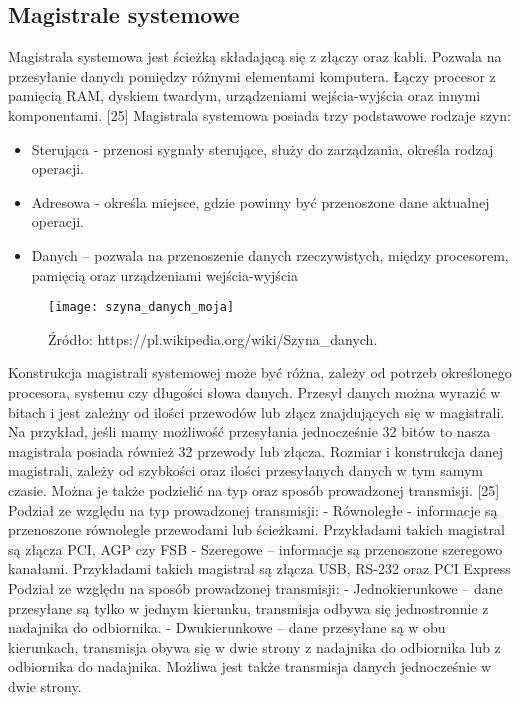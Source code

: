 \documentclass[12pt, a4paper, onside, polish]{article}				%
\begin{document}
\subsection{Magistrale systemowe}
\hspace{\parindent}
Magistrala systemowa jest ścieżką składającą się z złączy oraz kabli. Pozwala na przesyłanie danych pomiędzy różnymi elementami komputera. Łączy procesor z pamięcią RAM, dyskiem twardym, urządzeniami wejścia-wyjścia oraz innymi komponentami. [25]  \newline\newline
Magistrala systemowa posiada trzy podstawowe rodzaje szyn:
\begin{itemize}
\item Sterująca - przenosi sygnały sterujące, służy do zarządzania, określa rodzaj operacji.
\item Adresowa - określa miejsce, gdzie powinny być przenoszone dane aktualnej operacji. 
\item Danych – pozwala na przenoszenie danych rzeczywistych, między procesorem, pamięcią oraz urządzeniami wejścia-wyjścia 
\end{itemize}
 
 
 \begin{figure}[H]
{\centering \texttt{[image: szyna\_danych\_moja]} \caption{Magistrala systemowa} \caption*{Źródło: https://pl.wikipedia.org/wiki/Szyna_danych.}}\vspace{5mm}
\end{figure}


Konstrukcja magistrali systemowej może być różna, zależy od potrzeb określonego procesora, systemu czy długości słowa danych. Przesył danych można wyrazić w bitach i jest zależny od ilości przewodów lub złącz znajdujących się w magistrali. Na przykład, jeśli mamy możliwość przesyłania jednocześnie 32 bitów to nasza magistrala posiada również 32 przewody lub złącza. Rozmiar i konstrukcja danej magistrali, zależy od szybkości oraz ilości przesyłanych danych w tym samym czasie. Można je także podzielić na typ oraz sposób prowadzonej transmisji. [25] \newline \newline
Podział ze względu na typ prowadzonej transmisji: \newline
- Równoległe - informacje są przenoszone równolegle przewodami lub ścieżkami. Przykładami takich magistral są złącza PCI, AGP czy FSB \newline
- Szeregowe – informacje są przenoszone szeregowo kanałami. Przykładami takich magistral są złącza USB, RS-232 oraz PCI Express \newline\newline
Podział ze względu na sposób prowadzonej transmisji: \newline
- Jednokierunkowe – dane przesyłane są tylko w jednym kierunku, transmisja odbywa się jednostronnie z nadajnika do odbiornika. \newline
- Dwukierunkowe – dane przesyłane są w obu kierunkach, transmisja obywa się w dwie strony z nadajnika do odbiornika lub z odbiornika do nadajnika. Możliwa jest także transmisja danych jednocześnie w dwie strony. \newline
 
\end{document}
